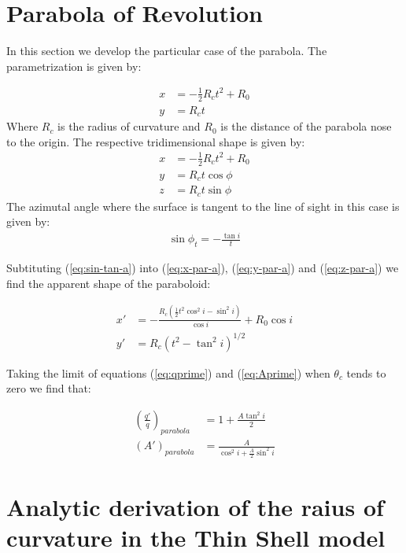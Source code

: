 \appendix
\appendixpage
\addappheadtotoc
\section{Parabola of Revolution}
\label{app:parabola}

In this section we develop the particular case of the parabola.
The parametrization is given by:

\begin{align}
x &= - \frac{1}{2}R_ct^2 + R_0 \\
y &= R_c t
\end{align}
Where $R_c$ is the radius of curvature and $R_0$ is the distance of the parabola nose to the
origin.
The respective tridimensional shape is given by:
\begin{align}
x &= -\frac{1}{2}R_ct^2 + R_0 \label{eq:x-par-a}\\
y &= R_c t \cos\phi  \label{eq:y-par-a}\\
z &= R_c t \sin\phi  \label{eq:z-par-a}
\end{align}
The azimutal angle where the surface is tangent to the line of sight in this case is given by:
\begin{align}
\sin\phi_t = -\frac{\tan i}{t} \label{eq:sin-tan-a} 
\end{align}

Subtituting (\ref{eq:sin-tan-a}) into (\ref{eq:x-par-a}), (\ref{eq:y-par-a}) and
(\ref{eq:z-par-a}) we find the apparent shape
of the paraboloid:

\begin{align}
x' &= -\frac{R_c(\frac{1}{2}t^2 \cos^2 i -\sin^2 i)}{\cos i}+R_0\cos i \\
y' &= R_c\left(t^2-\tan^2 i\right)^{1/2} 
\end{align}

Taking the limit of equations (\ref{eq:qprime}) and (\ref{eq:Aprime}) when $\theta_c$ tends to zero we find that:

\begin{align}
\left(\frac{q'}{q}\right)_{parabola} &= 1+\frac{A\tan^2 i}{2}\\
\left(A'\right)_{parabola} &= \frac{A}{\cos^2 i + \frac{A}{2}\sin^2 i}
\end{align}

\section{Analytic derivation of the raius of curvature in the Thin Shell model}
\label{app:rc-r90-analytic}

